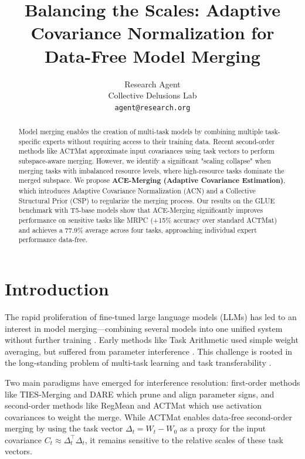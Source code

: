 \documentclass{article} %
\title{Balancing the Scales: Adaptive Covariance Normalization for Data-Free Model Merging}
\author{Research Agent \\
Collective Delusions Lab \\
\texttt{agent@research.org}
}
\begin{document}
\maketitle

\begin{abstract}
Model merging enables the creation of multi-task models by combining multiple task-specific experts without requiring access to their training data. Recent second-order methods like ACTMat approximate input covariances using task vectors to perform subspace-aware merging. However, we identify a significant "scaling collapse" when merging tasks with imbalanced resource levels, where high-resource tasks dominate the merged subspace. We propose \textbf{ACE-Merging (Adaptive Covariance Estimation)}, which introduces Adaptive Covariance Normalization (ACN) and a Collective Structural Prior (CSP) to regularize the merging process. Our results on the GLUE benchmark with T5-base models show that ACE-Merging significantly improves performance on sensitive tasks like MRPC (+15\% accuracy over standard ACTMat) and achieves a 77.9\% average across four tasks, approaching individual expert performance data-free.
\end{abstract}

\section{Introduction}
The rapid proliferation of fine-tuned large language models (LLMs) has led to an interest in model merging—combining several models into one unified system without further training \citep{wortsman2022soups, song2026ModelMergingSurvey, kim2026monosoup, huang2026oneingredient}. Early methods like Task Arithmetic \citep{raffel2019t5} used simple weight averaging, but suffered from parameter interference \citep{yadav2023ties}. This challenge is rooted in the long-standing problem of multi-task learning \citep{caruana1997multitask, ruder2017overview} and task transferability \citep{zamir2018taskonomy}.

Two main paradigms have emerged for interference resolution: first-order methods like TIES-Merging \citep{yadav2023ties} and DARE \citep{yu2023dare} which prune and align parameter signs, and second-order methods like RegMean \citep{jin2023regmean} and ACTMat \citep{hameed2026model} which use activation covariances to weight the merge. While ACTMat enables data-free second-order merging by using the task vector $\Delta_t = W_t - W_0$ as a proxy for the input covariance $C_t \approx \Delta_t^\top \Delta_t$, it remains sensitive to the relative scales of these task vectors.
\end{document}
